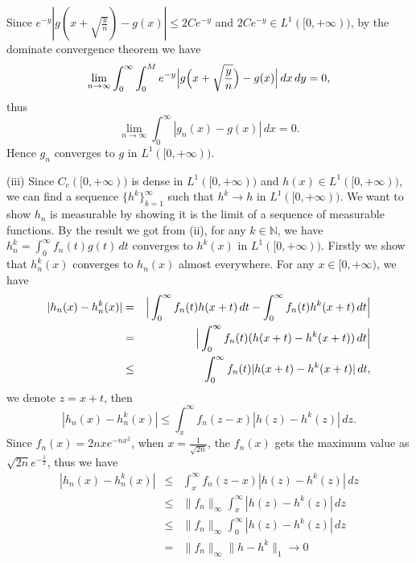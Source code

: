 \documentclass[12pt,a4paper]{ctexart}
\begin{document}
Since $e^{-y} | g ( x + \sqrt{\frac{y}{n}} )  - g(x) | \leq 2 C e^{-y}$ and $2 C e^{-y} \in L^{1}([0, + \infty))$,  by the dominate convergence theorem we have
\begin{equation*}
    \lim_{n \to \infty}  \int_{0}^{\infty} \int_{0}^{M}  e^{-y} \Big{|} g \Big{(} x + \sqrt{\frac{y}{n}} \Big{)}  - g(x) \Big{|} \, d x \, d y = 0,
\end{equation*}
thus 
\begin{equation*}
    \lim_{n \to \infty} \int_{0}^{\infty} |g_{n}(x) - g(x)| \, d x  = 0.
\end{equation*}
Hence $g_{n}$ converges to $g$ in $L^{1}([0, + \infty))$.

\vspace{8pt}

(iii) Since $C_{c}([0, + \infty))$ is dense in $L^{1}([0, + \infty))$ and $h(x) \in L^{1}([0, + \infty))$, we can find a sequence $\{h^{k}\}_{k = 1}^{\infty}$ such that $h^{k} \to h$ in $L^{1}([0, + \infty))$. We want to show $h_{n}$ is measurable by showing it is the limit of a sequence of measurable functions. By the result we got from (ii), for any $k \in \mathbb{N}$, we have $h_{n}^{k} = \int_{0}^{\infty} f_{n}(t) g(t) \, d t$ converges to $h^{k}(x)$ in $L^{1}([0, + \infty))$. Firstly we show that $h_{n}^{k} (x)$ converges to $h_{n} (x)$ almost everywhere. For any $x \in [0, + \infty)$, we have
\begin{eqnarray*}
|h_{n}(x) - h_{n}^{k} (x)|  & = & \Big{|} \int_{0}^{\infty} f_{n} (t) h(x + t) \, d t - \int_{0}^{\infty} f_{n} (t) h^{k}(x + t) \, d t \Big{|} \\
 & = & \Big{|} \int_{0}^{\infty} f_{n} (t) ( h(x + t) - h^{k}(x + t)) \, d t \Big{|} \\
 & \leq & \int_{0}^{\infty} f_{n} (t) | h(x + t) - h^{k}(x + t)| \, d t,
\end{eqnarray*}
we denote $z = x + t$, then
\begin{equation*}
    |h_{n}(x) - h_{n}^{k} (x)| \leq \int_{x}^{\infty} f_{n} (z - x) | h(z) - h^{k}(z)| \, d z.
\end{equation*}
Since $f_{n}(x) = 2 n x e^{-n x^{2}}$, when $x = \frac{1}{\sqrt{2n}}$, the $f_{n}(x)$ gets the maximum value as $\sqrt{2n} e^{-\frac{1}{2}}$, thus we have
\begin{eqnarray*}
|h_{n}(x) - h_{n}^{k} (x)|  & \leq & \int_{x}^{\infty} f_{n} (z - x) | h(z) - h^{k}(z)| \, d z \\
 & \leq  & \|f_{n}\|_{\infty} \int_{x}^{\infty} |h(z) - h^{k} (z)| \, d z \\
 & \leq & \|f_{n}\|_{\infty} \int_{0}^{\infty} |h(z) - h^{k} (z)| \, d z \\
 & = & \|f_{n}\|_{\infty}  \|h - h^{k}\|_{1} \to 0
\end{eqnarray*}
\end{document}
